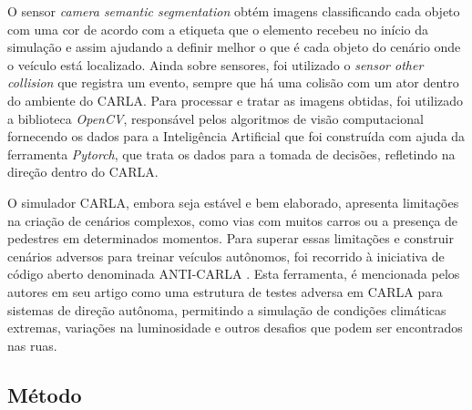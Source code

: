\documentclass[a4paper,12pt,Times]{article}
\begin{document}
O sensor \textit{camera semantic segmentation} obtém imagens classificando cada
objeto com uma cor de acordo com a etiqueta que o elemento recebeu no início da
simulação e assim ajudando a definir melhor o que é cada objeto do cenário onde
o veículo está localizado.
Ainda sobre sensores, foi utilizado o \textit{sensor other collision} que registra um evento, sempre que há uma colisão com um ator dentro do ambiente do CARLA. Para processar e tratar as imagens obtidas, foi utilizado a biblioteca \textit{OpenCV}, responsável pelos algoritmos de visão computacional fornecendo os dados para a Inteligência Artificial que foi construída com ajuda da ferramenta \textit{Pytorch}, que trata os dados para a tomada de decisões, refletindo na direção dentro do CARLA.



O simulador CARLA, embora seja estável e bem elaborado, apresenta limitações na criação de cenários complexos, como vias com muitos carros ou a presença de pedestres em determinados momentos. Para superar essas limitações e construir cenários adversos para treinar veículos autônomos, foi recorrido à iniciativa de código aberto denominada ANTI-CARLA \cite{ramakrishna2022anticarla}. Esta ferramenta, é mencionada pelos autores em seu artigo como uma estrutura de testes adversa em CARLA para sistemas de direção autônoma, permitindo a simulação de condições climáticas extremas, variações na luminosidade e outros desafios que podem ser encontrados nas ruas.

\subsection{Método}
\end{document}
